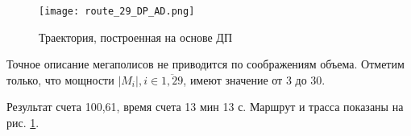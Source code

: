 \begin{figure}[h]
  \begin{center}
  \texttt{[image: route\_29\_DP\_AD.png]}
  \caption{Траектория, построенная на основе ДП}
  \label{DP_Result}
  \end{center}
\end{figure}

Точное описание мегаполисов не приводится по соображениям объема.
Отметим только, что мощности
$|M_i|, i\in \overline{1,29}$,
имеют значение от 3 до 30.

Результат счета 100,61,
время счета 13 мин 13 с.
Маршрут и трасса показаны
на рис. \ref{DP_Result}.
